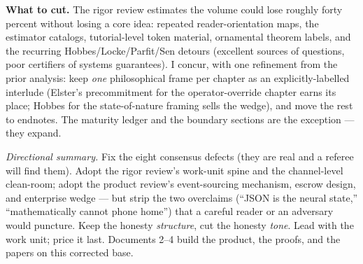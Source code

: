 \documentclass[11pt,a4paper]{article}
\begin{document}
\noindent\textbf{What to cut.} The rigor review estimates the volume could lose roughly forty percent without losing a core idea: repeated reader-orientation maps, the estimator catalogs, tutorial-level token material, ornamental theorem labels, and the recurring Hobbes/Locke/Parfit/Sen detours (excellent sources of questions, poor certifiers of systems guarantees). I concur, with one refinement from the prior analysis: keep \emph{one} philosophical frame per chapter as an explicitly-labelled interlude (Elster's precommitment for the operator-override chapter earns its place; Hobbes for the state-of-nature framing sells the wedge), and move the rest to endnotes. The maturity ledger and the boundary sections are the exception --- they expand.

\vspace{1em}
\noindent\hrulefill

\noindent\emph{Directional summary.} Fix the eight consensus defects (they are real and a referee will find them). Adopt the rigor review's work-unit spine and the channel-level clean-room; adopt the product review's event-sourcing mechanism, escrow design, and enterprise wedge --- but strip the two overclaims (``JSON is the neural state,'' ``mathematically cannot phone home'') that a careful reader or an adversary would puncture. Keep the honesty \emph{structure}, cut the honesty \emph{tone}. Lead with the work unit; price it last. Documents 2--4 build the product, the proofs, and the papers on this corrected base.
\end{document}
